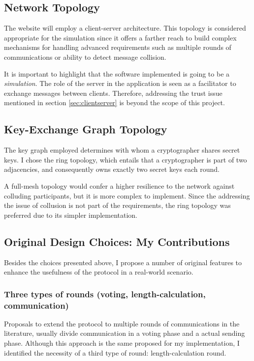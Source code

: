 \subsection{Network Topology}
The website will employ a client-server architecture. This topology is considered appropriate for the simulation since it offers a farther reach to build complex mechanisms for handling advanced requirements such as multiple rounds of communications or ability to detect message collision.

It is important to highlight that the software implemented is going to be a \emph{simulation}. The role of the server in the application is seen as a facilitator to exchange messages between clients. Therefore, addressing the trust issue mentioned in section \ref{sec:clientserver} is beyond the scope of this project.


\subsection{Key-Exchange Graph Topology}
The key graph employed determines with whom a cryptographer shares secret keys. I chose the ring topology, which entails that a cryptographer is part of two adjacencies, and consequently owns exactly two secret keys each round. 

A full-mesh topology would confer a higher resilience to the network against colluding participants, but it is more complex to implement. Since the addressing the issue of collusion is not part of the requirements, the ring topology was preferred due to its simpler implementation.


\subsection{Original Design Choices: My Contributions}
Besides the choices presented above, I propose a number of original features to enhance the usefulness of the protocol in a real-world scenario.







\subsubsection{Three types of rounds (voting, length-calculation, communication)} \label{sec:threeRoundTypes}

Proposals to extend the protocol to multiple rounds of communications in the literature, usually divide communication in a voting phase and a actual sending phase. Although this approach is the same proposed for my implementation, I identified the necessity of a third type of round: length-calculation round. 


